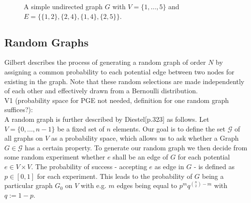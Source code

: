 \begin{figure}[h]
    \centering
    \caption{A simple undirected graph $G$ with $V=\{1,...,5\}$ and $E=\{\{1,2\},\{2,4\},\{1,4\},\{2,5\}\}$.}
    \label{fig:graph-example}
\end{figure}

\subsection{Random Graphs}
Gilbert\cite{gilbert1959random} describes the process of generating a random graph of order $N$ by assigning a common probability to each potential edge between two nodes for existing in the graph. Note that these random selections are made independently of each other and effectively drawn from a Bernoulli distribution. \\
V1 (probability space for PGE not needed, definition for one random graph suffices?): \\
A random graph is further described by Diestel\cite{Diestel2017}[p.323] as follows. Let $V = \{0,...,n-1\}$ be a fixed set of $n$ elements. Our goal is to define the set $\mathcal{G}$ of all graphs on $V$ as a probability space, which allows us to ask whether a Graph $G \in \mathcal{G}$ has a certain property. To generate our random graph we then decide from some random experiment whether $e$ shall be an edge of $G$ for each potential $e \in V \times V$. The probability of success - accepting $e$ as edge in $G$ - is defined as $p \in [0,1]$ for each experiment. This leads to the probability of $G$ being a particular graph $G_0$ on $V$ with e.g. $m$ edges being equal to $p^m q^{\binom{n}{2}-m}$ with $q:=1-p$.
\bigskip

